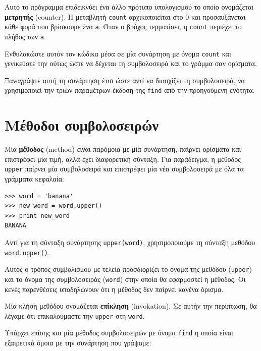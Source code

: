 \documentclass[10pt]{book}
\begin{document}
Αυτό το πρόγραμμα επιδεικνύει ένα άλλο πρότυπο υπολογισμού το οποίο ονομάζεται {\bf μετρητής} (counter). Η μεταβλητή {\tt count} αρχικοποιείται στο 0 και προσαυξάνεται κάθε φορά που βρίσκουμε ένα {\tt a}. Όταν ο βρόχος τερματίσει, η {\tt count} περιέχει το πλήθος των {\tt a}. 
\\
\begin{exercise}

Ενθυλακώστε αυτόν τον κώδικα μέσα σε μία συνάρτηση με όνομα {\tt count}
και γενικεύστε την ούτως ώστε να δέχεται τη συμβολοσειρά και το γράμμα σαν ορίσματα.
\\
\end{exercise}

\begin{exercise}

Ξαναγράψτε αυτή τη συνάρτηση έτσι ώστε αντί να διασχίζει τη συμβολοσειρά, να χρησιμοποιεί την τριών-παραμέτρων έκδοση της {\tt find} από την προηγούμενη ενότητα.
\end{exercise}


\section{Μέθοδοι συμβολοσειρών}

Μία {\bf μέθοδος} (method) είναι παρόμοια με μία συνάρτηση, παίρνει ορίσματα και επιστρέφει μία τιμή, αλλά έχει διαφορετική σύνταξη. Για παράδειγμα, η μέθοδος {\tt upper} παίρνει μία συμβολοσειρά και επιστρέφει μία νέα συμβολοσειρά με όλα τα γράμματα κεφαλαία:

\begin{verbatim}
>>> word = 'banana'
>>> new_word = word.upper()
>>> print new_word
BANANA
\end{verbatim}
%
Αντί για τη σύνταξη συνάρτησης {\tt upper(word)}, χρησιμοποιούμε τη σύνταξη μεθόδου {\tt word.upper()}.

 Αυτός ο τρόπος συμβολισμού με τελεία προσδιορίζει το όνομα της μεθόδου  ({\tt upper})  και το όνομα της συμβολοσειράς  ({\tt word})  στην οποία θα εφαρμοστεί η μέθοδος. Οι  κενές παρενθέσεις υποδηλώνουν ότι η μέθοδος δεν παίρνει κανένα όρισμα.

Μία κλήση μεθόδου ονομάζεται {\bf επίκληση} (invokation). Σε αυτήν την περίπτωση, θα λέγαμε ότι επικαλούμαστε την {\tt upper} στη {\tt word}. 

Υπάρχει επίσης και μία μέθοδος συμβολοσειρών με όνομα {\tt find} η οποία είναι εξαιρετικά όμοια με την συνάρτηση που γράψαμε:
\end{document}
